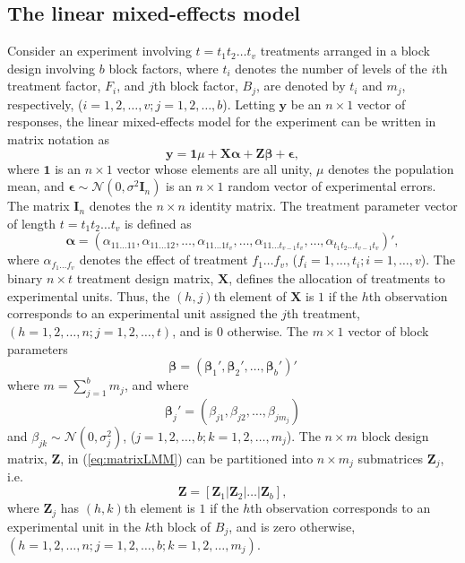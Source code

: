 \documentclass[article]{jss}
\newcommand{\I}{\mathbf{I}}
\newcommand{\Z}{\mathbf{Z}}
\newcommand{\X}{\mathbf{X}}
\begin{document}
\subsection{The linear mixed-effects model}
\label{subsec:matrixLMM}
Consider an experiment involving $t=t_1 t_2\ldots t_v$ treatments arranged in a block design involving $b$ block factors, where $t_i$ denotes the number of levels of the $i$th treatment factor, $F_i$, and $j$th block factor, $B_j$, are denoted by $t_i$ and $m_j$, respectively, ($i = 1,2, \dots, v; j = 1,2,\dots, b$). Letting $\bm{y}$ be an $n \times 1$ vector of responses, the linear mixed-effects model for the experiment can be written in matrix notation as
\begin{equation}\label{eq:matrixLMM}
\bm{y} = \mathbf{1}\mu + \X \bm{\alpha} + \Z\bm{\beta} + \bm{\epsilon},
\end{equation}
where $\mathbf{1}$ is an $n \times 1$ vector whose elements are all unity, $\mu$ denotes the population mean, and $\bm{\epsilon}\sim \mathcal{N}(0,\sigma^2 \I_n)$ is an $n \times 1$ random vector of experimental errors. The matrix $\I_n$ denotes the $n \times n$ identity matrix. The treatment parameter vector of length $t = t_1 t_2  \dots  t_v$ is defined as 
\begin{equation}
\label{eq:treatPar}
\bm{\alpha} = (\alpha_{11 \dots 11}, \alpha_{11 \dots 12}, \dots,  \alpha_{1 1 \dots 1t_v},\dots,\alpha_{1 1 \dots t_{v-1}t_v},\dots,\alpha_{t_1 t_2 \dots t_{v-1}t_v})',
\end{equation}
where $\alpha_{f_1 \dots f_v}$ denotes the effect of treatment $f_1 \dots f_v$, ($f_i = 1, \dots, t_i; i = 1,\dots, v$). The binary $n \times t$ treatment design matrix, $\X$, defines the allocation of treatments to experimental units. Thus, the $(h,j)$th element of $\X$ is $1$ if the $h$th observation corresponds to an experimental unit assigned the $j$th treatment, $(h=1,2,\dots,n; j=1,2,\dots, t)$, and is $0$ otherwise. The $m \times 1$ vector of block parameters 
\[
\bm{\beta} = (\bm{\beta}_1', \bm{\beta}_2', \ldots, \bm{\beta}_b')'
\] 
where $m=\sum_{j=1}^{b}m_j$, and where
\[
\bm{\beta}_j' = (\beta_{j1}, \beta_{j2}, \dots, \beta_{j m_j})
\]
and 
$\beta_{jk} \sim \mathcal{N}(0, \sigma_j^2)$, ($j=1,2,\dots,b; k=1,2,\dots, m_j$). The $n \times m$ block design matrix, $\Z$, in (\ref{eq:matrixLMM}) can be partitioned into $n \times m_j$ submatrices $\Z_j$, i.e.\ 
\[
\Z = [\Z_1 \vert \Z_2 \vert \ldots \vert \Z_b],
\]
where $\Z_j$ has $(h,k)$th element is $1$ if the $h$th observation corresponds to an experimental unit in the $k$th block of $B_j$, and is zero otherwise, $(h=1,2,\dots,n; j=1,2,\dots,b; k=1,2,\dots, m_j)$. 
\end{document}
